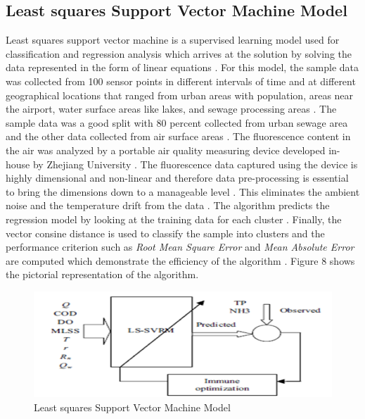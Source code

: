 \documentclass[sigconf]{acmart}
\begin{document}
\subsection{Least squares Support Vector Machine Model}
Least squares support vector machine is a supervised learning model used for classification and regression analysis which arrives at the solution by solving the data represented in the form of linear equations \cite{gagan2017}. For this model, the sample data was collected from 100 sensor points in different intervals of time and at different geographical locations that ranged from urban areas with population, areas near the airport, water surface areas like lakes, and sewage processing areas \cite{gagan2017}. The sample data was a good split with 80 percent collected from urban sewage area and the other data collected from air surface areas \cite{gagan2017}. The fluorescence content in the air was analyzed by a portable air quality measuring device developed in-house by Zhejiang University \cite{gagan2017}. The fluorescence data captured using the device is highly dimensional and non-linear and therefore data pre-processing is essential to bring the dimensions down to a manageable level \cite{gagan2017}. This eliminates the ambient noise and the temperature drift from the data \cite{gagan2017}. The algorithm predicts the regression model by looking at the training data for each cluster \cite{gagan2017}. Finally, the vector consine distance is used to classify the sample into clusters and the performance criterion such as {\em Root Mean Square Error}  and {\em Mean Absolute Error} are computed which demonstrate the efficiency of the algorithm \cite{gagan2017}. Figure 8 shows the pictorial representation of the algorithm.

\begin{figure}
\includegraphics[width=1.0\textwidth]{images/fig8.png}
\caption{Least squares Support Vector Machine Model \cite{gagan2017}}
\end{figure}
\end{document}
